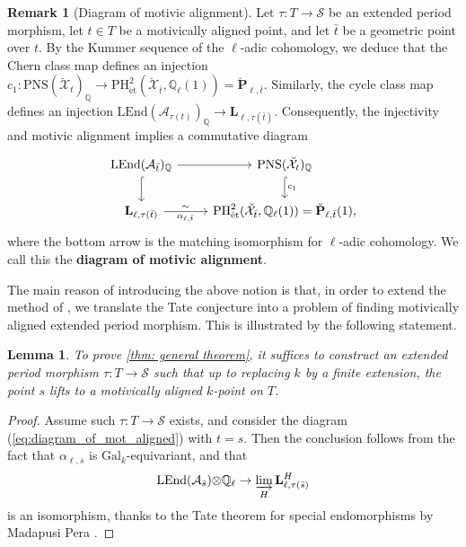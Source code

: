 \documentclass[11pt, letterpaper]{amsart}
\theoremstyle{plain}
\newtheorem{lemma}[theorem]{Lemma}
\theoremstyle{definition}
\newtheorem{remark}[theorem]{Remark}
\newcommand{\IQ}{\mathbb{Q}}
\newcommand\tensor{{\otimes}}
\newcommand{\<}{\langle}
\renewcommand{\>}{\rangle}
\newcommand{\Gal}{\mathrm{Gal}}
\newcommand{\et}{\mathrm{{\acute{e}}t}}
\newcommand{\shS}{\mathscr{S}}
\newcommand{\sA}{\mathcal{A}}
\newcommand{\sX}{\mathcal{X}}
\newcommand{\bL}{\mathbf{L}}
\newcommand{\LEnd}{\mathrm{LEnd}}
\newcommand{\PH}{\mathrm{PH}}
\newcommand{\PNS}{\mathrm{PNS}}
\newcommand{\bP}{\mathbf{P}}
\begin{document}
\begin{remark}[Diagram of motivic alignment]
    Let $\tau : T \to \shS$ be an extended period morphism, let $t\in T$ be a motivically aligned point, and let $\bar{t}$ be a geometric point over $t$.
    By the Kummer sequence of the $\ell$-adic cohomology, we deduce that the Chern class map defines an injection $c_1:\PNS(\breve{\sX}_t)_\IQ \to \PH^2_\et(\breve{\sX}_{\bar{t}},\IQ_\ell(1))=\breve{\bP}_{\ell,\bar{t}}$.
    Similarly, the cycle class map defines an injection $\LEnd(\sA_{\tau(t)})_\IQ \to \bL_{\ell,\tau(\bar{t})}$.
    Consequently, the injectivity and motivic alignment implies a commutative diagram
    \begin{equation}
        \label{eq:diagram_of_mot_aligned}
       \begin{tikzcd}
	{\LEnd(\sA_{\bar{t}})_\IQ} & {\PNS(\breve{\sX}_t)_\IQ} \\
	{\bL_{\ell, \tau(\bar{t})}} & {\PH^2_\et(\breve{\sX}_{\bar{t}}, \IQ_\ell(1)) = \breve{\bP}_{\ell, \bar{t}}}(1),
	\arrow[from=1-1, to=1-2]
	\arrow[hook, from=1-1, to=2-1]
	\arrow["c_1",hook, from=1-2, to=2-2]
	\arrow["\sim","\alpha_{\ell, \bar{t}}"', from=2-1, to=2-2]
        \end{tikzcd}
   \end{equation}
   where the bottom arrow is the matching isomorphism for $\ell$-adic cohomology.
   We call this the \textbf{diagram of motivic alignment}. 
\end{remark}




The main reason of introducing the above notion is that, in order to extend the method of \cite{MPTate}, we translate the Tate conjecture into a problem of finding motivically aligned extended period morphism.
This is illustrated by the following statement.
\begin{lemma}
	\label{lem: reduction}
	To prove \cref{thm: general theorem}, it suffices to construct an extended period morphism $\tau : T \to \shS$ such that up to replacing $k$ by a finite extension, the point $s$ lifts to a motivically aligned $k$-point on $T$. 
\end{lemma}
\begin{proof}
	Assume such $\tau : T \to \shS$ exists, and consider the diagram (\ref{eq:diagram_of_mot_aligned}) with $t = s$.
	Then the conclusion follows from the fact that $\alpha_{\ell, \bar{s}}$ is $\Gal_k$-equivariant, and that 
	$$ \LEnd(\sA_{\bar{s}}) \tensor \IQ_\ell \to \varinjlim_H \bL_{\ell, \tau(\bar{s})}^H $$
	is an isomorphism, thanks to the Tate theorem for special endomorphisms by Madapusi Pera \cite[Thm.~6.4]{MPTate}. 
\end{proof}
\end{document}
